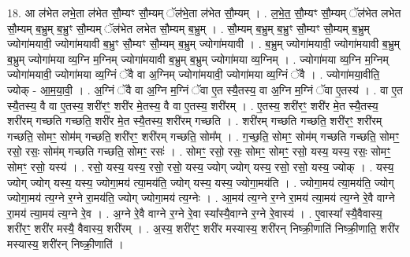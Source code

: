 \documentclass[17pt]{extarticle}
\begin{document}
18. आ ल॑भेत लभे॒ता ल॑भेत सौ॒म्यꣳ सौ॒म्यम् ॅल॑भे॒ता ल॑भेत सौ॒म्यम् । . ल॒भे॒त॒ सौ॒म्यꣳ सौ॒म्यम् ॅल॑भेत लभेत सौ॒म्यम् ब॒भ्रुम् ब॒भ्रुꣳ सौ॒म्यम् ॅल॑भेत लभेत सौ॒म्यम् ब॒भ्रुम् । . सौ॒म्यम् ब॒भ्रुम् ब॒भ्रुꣳ सौ॒म्यꣳ सौ॒म्यम् ब॒भ्रुम् ज्योगा॑मयावी॒ ज्योगा॑मयावी ब॒भ्रुꣳ सौ॒म्यꣳ सौ॒म्यम् ब॒भ्रुम् ज्योगा॑मयावी । . ब॒भ्रुम् ज्योगा॑मयावी॒ ज्योगा॑मयावी ब॒भ्रुम् ब॒भ्रुम् ज्योगा॑मया व्य॒ग्नि म॒ग्निम् ज्योगा॑मयावी ब॒भ्रुम् ब॒भ्रुम् ज्योगा॑मया व्य॒ग्निम् । . ज्योगा॑मया व्य॒ग्नि म॒ग्निम् ज्योगा॑मयावी॒ ज्योगा॑मया व्य॒ग्निं ॅवै वा अ॒ग्निम् ज्योगा॑मयावी॒ ज्योगा॑मया व्य॒ग्निं ॅवै । . ज्योगा॑मया॒वीति॒ ज्योक् - आ॒म॒या॒वी॒ । . अ॒ग्निं ॅवै वा अ॒ग्नि म॒ग्निं ॅवा ए॒त स्यै॒तस्य॒ वा अ॒ग्नि म॒ग्निं ॅवा ए॒तस्य॑ । . वा ए॒त स्यै॒तस्य॒ वै वा ए॒तस्य॒ शरी॑रꣳ॒॒ शरी॑र मे॒तस्य॒ वै वा ए॒तस्य॒ शरी॑रम् । . ए॒तस्य॒ शरी॑रꣳ॒॒ शरी॑र मे॒त स्यै॒तस्य॒ शरी॑रम् गच्छति गच्छति॒ शरी॑र मे॒त स्यै॒तस्य॒ शरी॑रम् गच्छति । . शरी॑रम् गच्छति गच्छति॒ शरी॑रꣳ॒॒ शरी॑रम् गच्छति॒ सोमꣳ॒॒ सोम॑म् गच्छति॒ शरी॑रꣳ॒॒ शरी॑रम् गच्छति॒ सोम᳚म् । . ग॒च्छ॒ति॒ सोमꣳ॒॒ सोम॑म् गच्छति गच्छति॒ सोमꣳ॒॒ रसो॒ रसः॒ सोम॑म् गच्छति गच्छति॒ सोमꣳ॒॒ रसः॑ । . सोमꣳ॒॒ रसो॒ रसः॒ सोमꣳ॒॒ सोमꣳ॒॒ रसो॒ यस्य॒ यस्य॒ रसः॒ सोमꣳ॒॒ सोमꣳ॒॒ रसो॒ यस्य॑ । . रसो॒ यस्य॒ यस्य॒ रसो॒ रसो॒ यस्य॒ ज्योग् ज्योग् यस्य॒ रसो॒ रसो॒ यस्य॒ ज्योक् । . यस्य॒ ज्योग् ज्योग् यस्य॒ यस्य॒ ज्योगा॒मय॑ त्या॒मय॑ति॒ ज्योग् यस्य॒ यस्य॒ ज्योगा॒मय॑ति । . ज्योगा॒मय॑ त्या॒मय॑ति॒ ज्योग् ज्योगा॒मय॑ त्य॒ग्ने र॒ग्ने रा॒मय॑ति॒ ज्योग् ज्योगा॒मय॑ त्य॒ग्नेः । . आ॒मय॑ त्य॒ग्ने र॒ग्ने रा॒मय॑ त्या॒मय॑ त्य॒ग्ने रे॒वै वाग्ने रा॒मय॑ त्या॒मय॑ त्य॒ग्ने रे॒व । . अ॒ग्ने रे॒वै वाग्ने र॒ग्ने रे॒वा स्या᳚स्यै॒वाग्ने र॒ग्ने रे॒वास्य॑ । . ए॒वास्या᳚ स्यै॒वैवास्य॒ शरी॑रꣳ॒॒ शरी॑र मस्यै॒ वैवास्य॒ शरी॑रम् । . अ॒स्य॒ शरी॑रꣳ॒॒ शरी॑र मस्यास्य॒ शरी॑रन् निष्क्री॒णाति॑ निष्क्री॒णाति॒ शरी॑र मस्यास्य॒ शरी॑रन् निष्क्री॒णाति॑ । \newline
\end{document}
